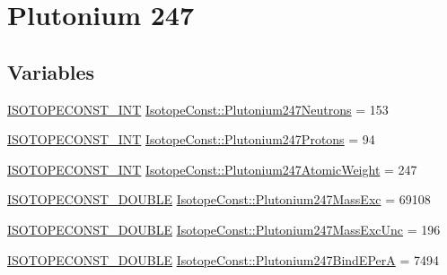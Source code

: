 \hypertarget{group___isotope_const-_plutonium-_pu247}{}\section{Plutonium 247}
\label{group___isotope_const-_plutonium-_pu247}
\subsection*{Variables}
\begin{DoxyCompactItemize}
\item 
\mbox{\hyperlink{group___isotope_const-_macros_ga5f18360b3e99483a35c32d789e62621c}{I\+S\+O\+T\+O\+P\+E\+C\+O\+N\+S\+T\+\_\+\+I\+NT}} \mbox{\hyperlink{group___isotope_const-_plutonium-_pu247_gaab8d6af78e125075d87cff3ac56734a9}{Isotope\+Const\+::\+Plutonium247\+Neutrons}} = 153
\item 
\mbox{\hyperlink{group___isotope_const-_macros_ga5f18360b3e99483a35c32d789e62621c}{I\+S\+O\+T\+O\+P\+E\+C\+O\+N\+S\+T\+\_\+\+I\+NT}} \mbox{\hyperlink{group___isotope_const-_plutonium-_pu247_ga8e889d2509fe93525cb7c16c16767f19}{Isotope\+Const\+::\+Plutonium247\+Protons}} = 94
\item 
\mbox{\hyperlink{group___isotope_const-_macros_ga5f18360b3e99483a35c32d789e62621c}{I\+S\+O\+T\+O\+P\+E\+C\+O\+N\+S\+T\+\_\+\+I\+NT}} \mbox{\hyperlink{group___isotope_const-_plutonium-_pu247_ga8366d339a9738b93b11604793b5735bc}{Isotope\+Const\+::\+Plutonium247\+Atomic\+Weight}} = 247
\item 
\mbox{\hyperlink{group___isotope_const-_macros_ga8f45a7272ce02c0b4c65c44636ed719a}{I\+S\+O\+T\+O\+P\+E\+C\+O\+N\+S\+T\+\_\+\+D\+O\+U\+B\+LE}} \mbox{\hyperlink{group___isotope_const-_plutonium-_pu247_ga717540b5a22958304971cbb298916ea3}{Isotope\+Const\+::\+Plutonium247\+Mass\+Exc}} = 69108
\item 
\mbox{\hyperlink{group___isotope_const-_macros_ga8f45a7272ce02c0b4c65c44636ed719a}{I\+S\+O\+T\+O\+P\+E\+C\+O\+N\+S\+T\+\_\+\+D\+O\+U\+B\+LE}} \mbox{\hyperlink{group___isotope_const-_plutonium-_pu247_gaa640d7b1a76ce9fa99504da3b4168d33}{Isotope\+Const\+::\+Plutonium247\+Mass\+Exc\+Unc}} = 196
\item 
\mbox{\hyperlink{group___isotope_const-_macros_ga8f45a7272ce02c0b4c65c44636ed719a}{I\+S\+O\+T\+O\+P\+E\+C\+O\+N\+S\+T\+\_\+\+D\+O\+U\+B\+LE}} \mbox{\hyperlink{group___isotope_const-_plutonium-_pu247_ga20155e9c9371807fd38ee0bacfd9a1f5}{Isotope\+Const\+::\+Plutonium247\+Bind\+E\+PerA}} = 7494
\item 

\end{DoxyCompactItemize}
